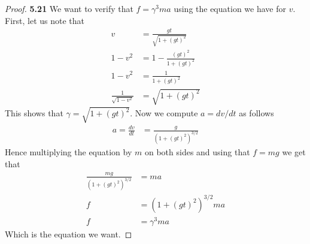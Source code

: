 \documentclass[11pt]{article}
\theoremstyle{definition}
\begin{document}
\cleardoublepage
\begin{proof}{\textbf{5.21}}
    We want to verify that $f = \gamma^3 ma$ using the equation we have for $v$.
    First, let us note that
    \begin{align*}
        v &= \frac{gt}{\sqrt{1 + (gt)^2}}\\
        1 - v^2 &= 1 - \frac{(gt)^2}{1 + (gt)^2}\\
        1 - v^2 &= \frac{1}{1 + (gt)^2}\\
        \frac{1}{\sqrt{1 - v^2}} &= \sqrt{1 + (gt)^2}
    \end{align*}
    This shows that $\gamma = \sqrt{1 + (gt)^2}$. Now we compute $a = dv/dt$
    as follows
    \begin{align*}
        a = \frac{dv}{dt} &= \frac{g}{(1 + (gt)^2)^{3/2}}
    \end{align*}
    Hence multiplying the equation by $m$ on both sides and using that
    $f = mg$ we get that
    \begin{align*}
        \frac{mg}{(1 + (gt)^2)^{3/2}} &= ma\\
        f &= (1 + (gt)^2)^{3/2}ma \\
        f &= \gamma^3ma
    \end{align*}
    Which is the equation we want.
\end{proof}
\cleardoublepage
\end{document}
